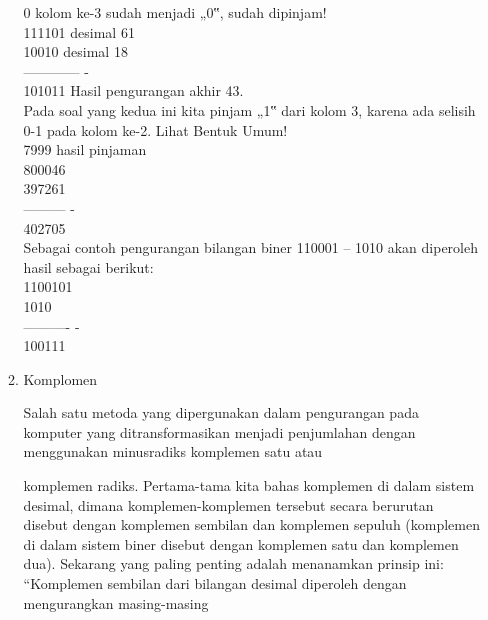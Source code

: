 \documentclass{article}
\begin{document}
\begin{enumerate}
\begin{enumerate}
0 \textrightarrow kolom ke-3 sudah menjadi „0‟, sudah dipinjam! \\
111101 \textrightarrow desimal 61 \\
10010 \textrightarrow desimal 18 \\
------------ - \\
101011 \textrightarrow Hasil pengurangan akhir 43. \\

Pada soal yang kedua ini kita pinjam „1‟ dari kolom 3, karena ada selisih 0-1 pada kolom ke-2. Lihat Bentuk Umum! \\





7999 \textrightarrow hasil pinjaman \\
800046 \\
397261 \\
--------- - \\
402705 \\
Sebagai contoh pengurangan bilangan biner 110001 – 1010 akan diperoleh hasil sebagai berikut: \\
1100101 \\
1010 \\
---------- - \\
100111 \\

\item Komplomen

Salah satu metoda yang dipergunakan dalam pengurangan pada komputer yang ditransformasikan menjadi penjumlahan dengan menggunakan minusradiks komplemen satu atau 




komplemen radiks. Pertama-tama kita bahas komplemen di dalam sistem desimal, dimana komplemen-komplemen tersebut secara berurutan disebut dengan komplemen sembilan dan komplemen sepuluh (komplemen di dalam sistem biner disebut dengan komplemen satu dan komplemen dua). Sekarang yang paling penting adalah menanamkan prinsip ini: \\
“Komplemen sembilan dari bilangan desimal diperoleh dengan mengurangkan masing-masing 





\end{enumerate}
\end{enumerate}
\end{document}
